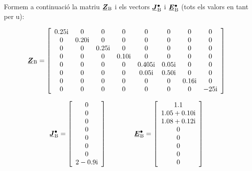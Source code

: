 \begin{exemple}
    Formem a continuació la matriu $\mcmplx{Z}\ped{B}$ i els vectors $\mcmplx{J}\ped{B}^\bullet$ i $\mcmplx{E}\ped{B}^\bullet$ (tots els valors en tant per u):

    \[
       \mcmplx{Z}\ped{B} =
       \begin{bmatrix}\begin{array}{cccccccc}
         \complexnum{j 0,25} & 0 & 0 & 0 & 0 & 0 & 0 & 0 \\
         0 & \complexnum{j 0,20} & 0 & 0 & 0 & 0 & 0 & 0 \\
         0 & 0 & \complexnum{j 0,25} & 0 & 0 & 0 & 0 & 0 \\
         0 & 0 & 0 & \complexnum{j 0,10} & 0 & 0 & 0 & 0 \\
         0 & 0 & 0 & 0 & \complexnum{j 0,405} & \complexnum{j 0,05} & 0 & 0 \\
         0 & 0 & 0 & 0 & \complexnum{j 0,05} & \complexnum{j 0,50} & 0 & 0 \\
         0 & 0 & 0 & 0 & 0 & 0 & \complexnum{j 0,16} & 0 \\
         0 & 0 & 0 & 0 & 0 & 0 & 0 & \complexnum{-j 25}
       \end{array}\end{bmatrix}
    \]

    \[
       \mcmplx{J}\ped{B}^\bullet =
       \begin{bmatrix}\begin{array}{c}
        0 \\
        0 \\
        0 \\
        0 \\
        0 \\
        0 \\
        0 \\
        \complexnum{2 - j 0,9}
       \end{array}\end{bmatrix}
       \qquad \qquad
       \mcmplx{E}\ped{B}^\bullet =
       \begin{bmatrix}\begin{array}{c}
        \num{1,1} \\
        \complexnum{1,05 + j 0,10} \\
        \complexnum{1,08 + j 0,12} \\
        0 \\
        0 \\
        0 \\
        0 \\
        0
      \end{array}\end{bmatrix}
    \]


\end{exemple}
